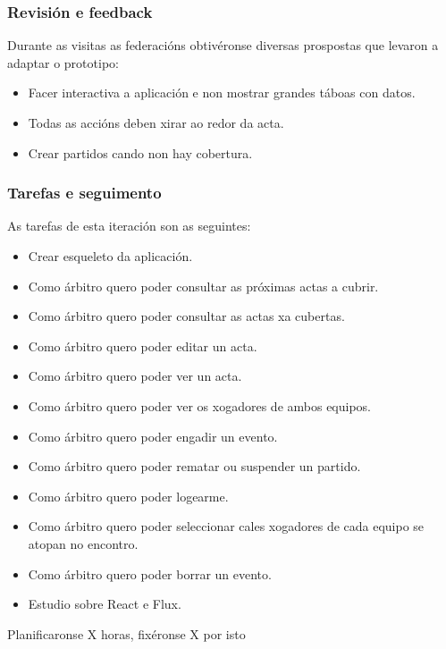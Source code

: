       \subsubsection{Revisión e feedback}
      Durante as visitas as federacións obtivéronse diversas prospostas que 
levaron a adaptar o prototipo:

      \begin{itemize}
        \item Facer interactiva a aplicación e non mostrar grandes táboas con 
datos.
        \item Todas as accións deben xirar ao redor da acta.
        \item Crear partidos cando non hay cobertura.
      \end{itemize}

      \subsubsection{Tarefas e seguimento}

      As tarefas de esta iteración son as seguintes:

      \begin{itemize}
        \item Crear esqueleto da aplicación.
        \item Como árbitro quero poder consultar as próximas actas a 
cubrir.
        \item Como árbitro quero poder consultar as actas xa cubertas.
        \item Como árbitro quero poder editar un acta.
        \item Como árbitro quero poder ver un acta.
        \item Como árbitro quero poder ver os xogadores de ambos equipos.
        \item Como árbitro quero poder engadir un evento.
        \item Como árbitro quero poder rematar ou suspender un partido.
        \item Como árbitro quero poder logearme.
        \item Como árbitro quero poder seleccionar cales xogadores de cada 
equipo se atopan no encontro.
        \item Como árbitro quero poder borrar un evento.
        \item Estudio sobre React e Flux.
       \end{itemize}

      Planificaronse X horas, fixéronse X por isto

